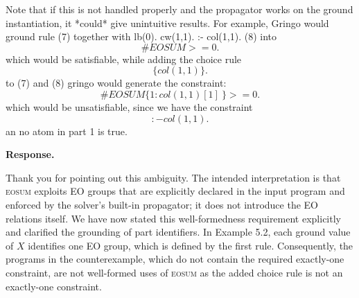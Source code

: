 \documentclass[11pt]{article}
\theoremstyle{definition}
\newenvironment{response}{
    \color{blue} \textbf{Response.}
}{
}
\begin{document}
Note that if this is not handled properly
and the propagator works on the ground instantiation,
it *could* give unintuitive results.
For example, Gringo would ground rule (7) together with
lb(0). cw(1,1). :- col(1,1). (8)
into
$$\#\mathit{EOSUM}{ } >= 0.$$
which would be satisfiable, while adding the choice rule
$$\{ col(1,1) \}.$$
to (7) and (8) gringo would generate the constraint:
$$\#\mathit{EOSUM}\{ 1 : col(1,1) [1]\ \} >= 0.$$
which would be unsatisfiable,
since we have the constraint
$$
:- col(1,1).
$$
an no atom in part 1 is true.

\begin{response}
Thank you for pointing out this ambiguity. The intended interpretation is that \textsc{eosum} exploits EO groups that are explicitly declared in the input program and enforced by the solver's built-in propagator; it does not introduce the EO relations itself. We have now stated this well-formedness requirement explicitly and clarified the grounding of part identifiers. In Example 5.2, each ground value of $X$ identifies one EO group, which is defined by the first rule. 
Consequently, the programs in the counterexample, which do not contain the required exactly-one constraint, are not well-formed uses of \textsc{eosum} as the added choice rule is not an exactly-one constraint.
\end{response}
\end{document}
